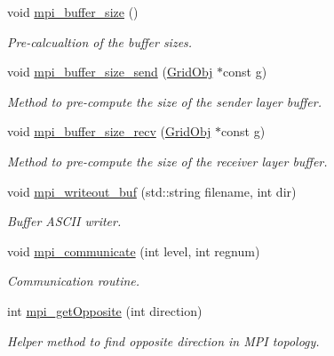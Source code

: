 \begin{DoxyCompactItemize}
void \hyperlink{class_mpi_manager_a1bf713399e26a5ffbc03147e0a20c585}{mpi\+\_\+buffer\+\_\+size} ()
\begin{DoxyCompactList}\small\item\em Pre-\/calcualtion of the buffer sizes. \end{DoxyCompactList}\item 
void \hyperlink{class_mpi_manager_a4d91c1912933394167a3a63bae09be43}{mpi\+\_\+buffer\+\_\+size\+\_\+send} (\hyperlink{class_grid_obj}{Grid\+Obj} $\ast$const g)
\begin{DoxyCompactList}\small\item\em Method to pre-\/compute the size of the sender layer buffer. \end{DoxyCompactList}\item 
void \hyperlink{class_mpi_manager_ae337c25ae5543d598ef937bfb5590c63}{mpi\+\_\+buffer\+\_\+size\+\_\+recv} (\hyperlink{class_grid_obj}{Grid\+Obj} $\ast$const g)
\begin{DoxyCompactList}\small\item\em Method to pre-\/compute the size of the receiver layer buffer. \end{DoxyCompactList}\item 
void \hyperlink{class_mpi_manager_ab498bdf0822e2747f83c187d682dd934}{mpi\+\_\+writeout\+\_\+buf} (std\+::string filename, int dir)
\begin{DoxyCompactList}\small\item\em Buffer A\+S\+C\+II writer. \end{DoxyCompactList}\item 
void \hyperlink{class_mpi_manager_aedcf84c06fc3e0486fac61d09ce0a268}{mpi\+\_\+communicate} (int level, int regnum)
\begin{DoxyCompactList}\small\item\em Communication routine. \end{DoxyCompactList}\item 
int \hyperlink{class_mpi_manager_a3c10ab477c2e4387d6a02104f9b2a2ea}{mpi\+\_\+get\+Opposite} (int direction)
\begin{DoxyCompactList}\small\item\em Helper method to find opposite direction in M\+PI topology. \end{DoxyCompactList}\end{DoxyCompactItemize}
